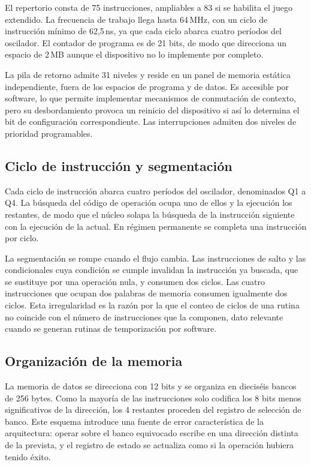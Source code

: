 El repertorio consta de 75 instrucciones, ampliables a 83 si se habilita el
juego extendido. La frecuencia de trabajo llega hasta 64\,MHz, con un ciclo de
instrucción mínimo de 62,5\,ns, ya que cada ciclo abarca cuatro períodos del
oscilador. El contador de programa es de 21 bits, de modo que direcciona un
espacio de 2\,MB aunque el dispositivo no lo implemente por completo.

La pila de retorno admite 31 niveles y reside en un panel de memoria estática
independiente, fuera de los espacios de programa y de datos. Es accesible por
software, lo que permite implementar mecanismos de conmutación de contexto, pero
su desbordamiento provoca un reinicio del dispositivo si así lo determina el bit
de configuración correspondiente. Las interrupciones admiten dos niveles de
prioridad programables.

\subsection{Ciclo de instrucción y segmentación}

Cada ciclo de instrucción abarca cuatro períodos del oscilador, denominados Q1 a
Q4. La búsqueda del código de operación ocupa uno de ellos y la ejecución los
restantes, de modo que el núcleo solapa la búsqueda de la instrucción siguiente
con la ejecución de la actual. En régimen permanente se completa una instrucción
por ciclo.

La segmentación se rompe cuando el flujo cambia. Las instrucciones de salto y
las condicionales cuya condición se cumple invalidan la instrucción ya buscada,
que se sustituye por una operación nula, y consumen dos ciclos. Las cuatro
instrucciones que ocupan dos palabras de memoria consumen igualmente dos ciclos.
Esta irregularidad es la razón por la que el conteo de ciclos de una rutina no
coincide con el número de instrucciones que la componen, dato relevante cuando
se generan rutinas de temporización por software.

\subsection{Organización de la memoria}

La memoria de datos se direcciona con 12 bits y se organiza en dieciséis bancos
de 256 bytes. Como la mayoría de las instrucciones solo codifica los 8 bits
menos significativos de la dirección, los 4 restantes proceden del registro de
selección de banco. Este esquema introduce una fuente de error característica de
la arquitectura: operar sobre el banco equivocado escribe en una dirección
distinta de la prevista, y el registro de estado se actualiza como si la
operación hubiera tenido éxito.

